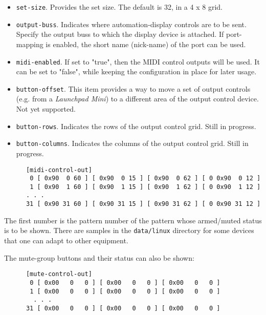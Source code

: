    \begin{itemize}
      \item \texttt{set-size}.
         Provides the set size.  The default is 32, in a 4 x 8 grid.
      \item \texttt{output-buss}.
         Indicates where automation-display controls are to be sent.
         Specify the output buss to which the display device is attached. If
         port-mapping is enabled, the short name (nick-name) of the port can be
         used.
      \item \texttt{midi-enabled}.
         If set to "true", then the MIDI control outputs will be used.
         It can be set to "false", while keeping the configuration in place
         for later usage.
      \item \texttt{button-offset}.
         This item provides a way to move a set of output controls (e.g. from a
         \textsl{Launchpad Mini}) to a different area of the output control
         device.  Not yet supported.
      \item \texttt{button-rows}.
         Indicates the rows of the output control grid.
         Still in progress.
      \item \texttt{button-columns}.
         Indicates the columns of the output control grid.
         Still in progress.
   \end{itemize}

   \begin{verbatim}
      [midi-control-out]
       0 [ 0x90  0 60 ] [ 0x90  0 15 ] [ 0x90  0 62 ] [ 0 0x90  0 12 ]
       1 [ 0x90  1 60 ] [ 0x90  1 15 ] [ 0x90  1 62 ] [ 0 0x90  1 12 ]
      . . .
      31 [ 0x90 31 60 ] [ 0x90 31 15 ] [ 0x90 31 62 ] [ 0 0x90 31 12 ]
   \end{verbatim}

   The first number is the pattern number of the pattern whose armed/muted
   status is to be shown.
   There are samples in the \texttt{data/linux} directory for some devices that
   one can adapt to other equipment.

   The mute-group buttons and their status can also be shown:

   \begin{verbatim}
      [mute-control-out]
       0 [ 0x00   0   0 ] [ 0x00   0   0 ] [ 0x00   0   0 ]
       1 [ 0x00   0   0 ] [ 0x00   0   0 ] [ 0x00   0   0 ]
        . . .
      31 [ 0x00   0   0 ] [ 0x00   0   0 ] [ 0x00   0   0 ]
   \end{verbatim}

